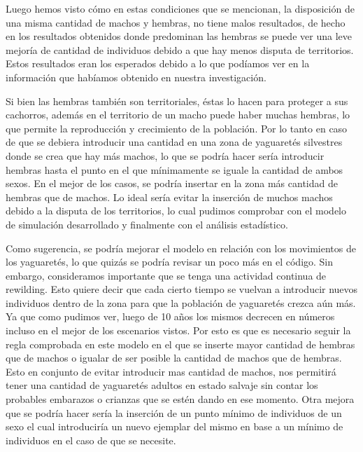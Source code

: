   Luego hemos visto cómo en estas condiciones que se mencionan, la disposición de una misma cantidad de machos y hembras, no tiene malos resultados, de hecho en los resultados obtenidos donde predominan las hembras se puede ver una leve mejoría de cantidad de individuos debido a que hay menos disputa de territorios. Estos resultados eran los esperados debido a lo que podíamos ver en la información que habíamos obtenido en nuestra investigación.

  Si bien las hembras también son territoriales, éstas lo hacen para proteger a sus cachorros, además en el territorio de un macho puede haber muchas hembras, lo que permite la reproducción y crecimiento de la población. Por lo tanto en caso de que se debiera introducir una cantidad en una zona de yaguaretés silvestres donde se crea que hay más machos, lo que se podría hacer sería introducir hembras hasta el punto en el que mínimamente se iguale la cantidad de ambos sexos. En el mejor de los casos, se podría insertar en la zona más cantidad de hembras que de machos. Lo ideal sería evitar la inserción de muchos machos debido a la disputa de los territorios, lo cual pudimos comprobar con el modelo de simulación desarrollado y finalmente con el análisis estadístico.

  Como sugerencia, se podría mejorar el modelo en relación con los movimientos de los yaguaretés, lo que quizás se podría revisar un poco más en el código. Sin embargo, consideramos importante que se tenga una actividad continua de rewilding. Esto quiere decir que cada cierto tiempo se vuelvan a introducir nuevos individuos dentro de la zona para que la población de yaguaretés crezca aún más. Ya que como pudimos ver, luego de 10 años los mismos decrecen en números incluso en el mejor de los escenarios vistos. Por esto es que es necesario seguir la regla comprobada en este modelo en el que se inserte mayor cantidad de hembras que de machos o igualar de ser posible la cantidad de machos que de hembras.
Esto en conjunto de evitar introducir mas cantidad de machos, nos permitirá tener una cantidad de yaguaretés adultos en estado salvaje sin contar los probables embarazos o crianzas que se estén dando en ese momento. Otra mejora que se podría hacer sería la inserción de un punto mínimo de individuos de un sexo el cual introduciría un nuevo ejemplar del mismo en base a un mínimo de individuos en el caso de que se necesite.
